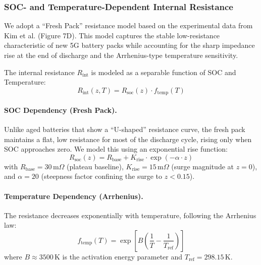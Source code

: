 \documentclass{mcmthesis}
\begin{document}
\subsubsection{SOC- and Temperature-Dependent Internal Resistance}
We adopt a ``Fresh Pack'' resistance model based on the experimental data from Kim et al. (Figure 7D). This model captures the stable low-resistance characteristic of new 5G battery packs while accounting for the sharp impedance rise at the end of discharge and the Arrhenius-type temperature sensitivity.

The internal resistance $R_{\mathrm{int}}$ is modeled as a separable function of SOC and Temperature:
\begin{equation}
R_{\mathrm{int}}(z, T) = R_{\mathrm{soc}}(z) \cdot f_{\mathrm{temp}}(T)
\end{equation}

\paragraph{SOC Dependency (Fresh Pack).}
Unlike aged batteries that show a ``U-shaped'' resistance curve, the fresh pack maintains a flat, low resistance for most of the discharge cycle, rising only when SOC approaches zero. We model this using an exponential rise function:
\begin{equation}
R_{\mathrm{soc}}(z) = R_{\mathrm{base}} + K_{\mathrm{rise}} \cdot \exp(-\alpha \cdot z)
\end{equation}
with $R_{\mathrm{base}} = 30$\,m$\Omega$ (plateau baseline), $K_{\mathrm{rise}} = 15$\,m$\Omega$ (surge magnitude at $z=0$), and $\alpha = 20$ (steepness factor confining the surge to $z < 0.15$).

\paragraph{Temperature Dependency (Arrhenius).}
The resistance decreases exponentially with temperature, following the Arrhenius law:
\begin{equation}
f_{\mathrm{temp}}(T) = \exp\left[ B \left( \frac{1}{T} - \frac{1}{T_{\mathrm{ref}}} \right) \right]
\end{equation}
where $B \approx 3500\,\mathrm{K}$ is the activation energy parameter and $T_{\mathrm{ref}} = 298.15\,\mathrm{K}$.
\end{document}
